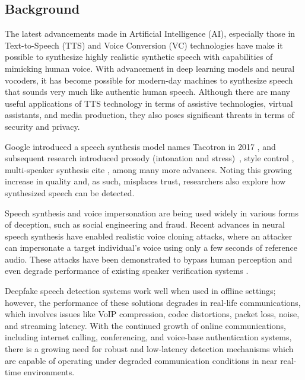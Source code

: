 \subsection{Background}

The latest advancements made in Artificial Intelligence (AI), especially those in Text-to-Speech (TTS) and Voice Conversion (VC) technologies have make it possible to synthesize highly realistic synthetic speech with capabilities of mimicking human voice. With advancement in deep learning models and neural vocoders, it has become possible for modern-day machines to synthesize speech that sounds very much like authentic human speech. Although there are many useful applications of TTS technology in terms of assistive technologies, virtual assistants, and media production, they also poses significant threats in terms of security and privacy.

Google introduced a speech synthesis model names Tacotron in 2017 \cite{tacotron2017}, and subsequent research introduced prosody (intonation and stress)~\cite{prosody2018}, style control \cite{styletokens2018}, multi-speaker synthesis cite \cite{transfer2018}, among many more advances. Noting this growing increase in quality and, as such, misplaces trust, researchers also explore how synthesized speech can be detected.

Speech synthesis and voice impersonation are being used widely in various forms of deception, such as social engineering and fraud. Recent advances in neural speech synthesis have enabled realistic voice cloning attacks, where an attacker can impersonate a target individual’s voice using only a few seconds of reference audio. These attacks have been demonstrated to bypass human perception and even degrade performance of existing speaker verification systems \cite{firc2023deepfake}.

Deepfake speech detection systems work well when used in offline settings; however, the performance of these solutions degrades in real-life communications, which involves issues like VoIP compression, codec distortions, packet loss, noise, and streaming latency. With the continued growth of online communications, including internet calling, conferencing, and voice-base authentication systems, there is a growing need for robust and low-latency detection mechanisms which are capable of operating under degraded communication conditions in near real-time environments.